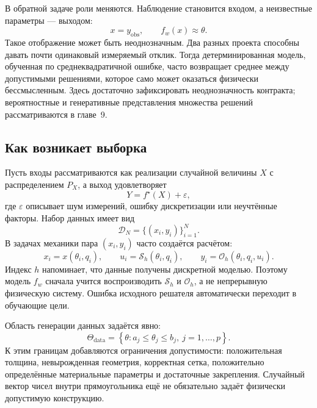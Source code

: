 В обратной задаче роли меняются. Наблюдение становится входом, а неизвестные параметры --- выходом:
\begin{equation}
 x=y_{\mathrm{obs}},
 \qquad
 f_w(x)\approx\theta.
\end{equation}
Такое отображение может быть неоднозначным. Два разных проекта способны давать почти одинаковый измеряемый отклик. Тогда детерминированная модель, обученная по среднеквадратичной ошибке, часто возвращает среднее между допустимыми решениями, которое само может оказаться физически бессмысленным. Здесь достаточно зафиксировать неоднозначность контракта; вероятностные и генеративные представления множества решений рассматриваются в главе~9.

\subsection{Как возникает выборка}
Пусть входы рассматриваются как реализации случайной величины $X$ с распределением $P_X$, а выход удовлетворяет
\begin{equation}
 Y=f^\star(X)+\varepsilon,
\end{equation}
где $\varepsilon$ описывает шум измерений, ошибку дискретизации или неучтённые факторы. Набор данных имеет вид
\begin{equation}
 \mathcal D_N
 =
 \{(x_i,y_i)\}_{i=1}^{N}.
\end{equation}
В задачах механики пара $(x_i,y_i)$ часто создаётся расчётом:
\begin{equation}
 x_i=x(\theta_i,q_i),
 \qquad
 u_i=\mathcal S_h(\theta_i,q_i),
 \qquad
 y_i=\mathcal O_h(\theta_i,q_i,u_i).
\end{equation}
Индекс $h$ напоминает, что данные получены дискретной моделью. Поэтому модель $f_w$ сначала учится воспроизводить $\mathcal S_h$ и $\mathcal O_h$, а не непрерывную физическую систему. Ошибка исходного решателя автоматически переходит в обучающие цели.

Область генерации данных задаётся явно:
\begin{equation}
\label{eq:parameter-domain}
 \Theta_{\mathrm{data}}
 =
 \left\{
 \theta:
 a_j\leq\theta_j\leq b_j,
 \ j=1,\ldots,p
 \right\}.
\end{equation}
К этим границам добавляются ограничения допустимости: положительная толщина, невырожденная геометрия, корректная сетка, положительно определённые материальные параметры и достаточные закрепления. Случайный вектор чисел внутри прямоугольника ещё не обязательно задаёт физически допустимую конструкцию.

